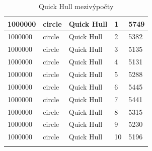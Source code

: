 \documentclass[12pt]{article}
\begin{document}
\begin{longtable}{|l|l|l|l|l|}
1000000      & circle            & Quick Hull & 1          & 5749                          \\ \hline
1000000      & circle            & Quick Hull & 2          & 5382                          \\ \hline
1000000      & circle            & Quick Hull & 3          & 5135                          \\ \hline
1000000      & circle            & Quick Hull & 4          & 5131                          \\ \hline
1000000      & circle            & Quick Hull & 5          & 5288                          \\ \hline
1000000      & circle            & Quick Hull & 6          & 5445                          \\ \hline
1000000      & circle            & Quick Hull & 7          & 5441                          \\ \hline
1000000      & circle            & Quick Hull & 8          & 5315                          \\ \hline
1000000      & circle            & Quick Hull & 9          & 5230                          \\ \hline
1000000      & circle            & Quick Hull & 10         & 5196                          \\ \hline
\caption{Quick Hull mezivýpočty}
\end{longtable}
\end{document}
